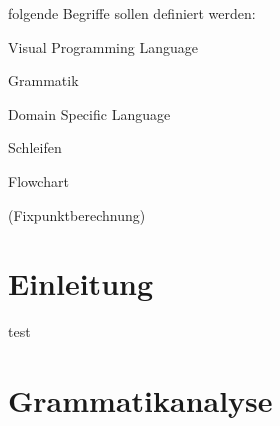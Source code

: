 \documentclass{article}
\begin{document}
    folgende Begriffe sollen definiert werden:

    Visual Programming Language

    Grammatik

    Domain Specific Language

    Schleifen

    Flowchart

    (Fixpunktberechnung)
    \newpage
    \tableofcontents
    \newpage
    \section{Einleitung}
    test
    \newpage
    \section{Grammatikanalyse}
\end{document}

